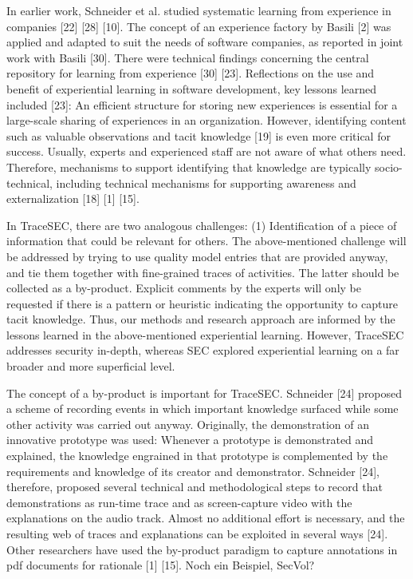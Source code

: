 In earlier work, Schneider et al. studied systematic learning from experience in companies [22] [28] [10]. The concept of an experience factory by Basili [2] was applied and adapted to suit the needs of software companies, as reported in joint work with Basili [30]. There were technical findings concerning the central repository for learning from experience [30] [23]. Reflections on the use and benefit of experiential learning in software development, key lessons learned included [23]: An efficient structure for storing new experiences is essential for a large-scale sharing of experiences in an organization. However, identifying content such as valuable observations and tacit knowledge [19] is even more critical for success. Usually, experts and experienced staff are not aware of what others need. Therefore, mechanisms to support identifying that knowledge are typically socio-technical, including technical mechanisms for supporting awareness and externalization [18] [1] [15]. 

In TraceSEC, there are two analogous challenges: (1) Identification of a piece of information that could be relevant for others. The above-mentioned challenge will be addressed by trying to use quality model entries that are provided anyway, and tie them together with fine-grained traces of activities. The latter should be collected as a by-product. Explicit comments by the experts will only be requested if there is a pattern or heuristic indicating the opportunity to capture tacit knowledge. Thus, our methods and research approach are informed by the lessons learned in the above-mentioned experiential learning. However, TraceSEC addresses security in-depth, whereas SEC explored experiential learning on a far broader and more superficial level.

The concept of a by-product is important for TraceSEC. Schneider [24] proposed a scheme of recording events in which important knowledge surfaced while some other activity was carried out anyway. Originally, the demonstration of an innovative prototype was used: Whenever a prototype is demonstrated and explained, the knowledge engrained in that prototype is complemented by the requirements and knowledge of its creator and demonstrator. Schneider [24], therefore, proposed several technical and methodological steps to record that demonstrations as run-time trace and as screen-capture video with the explanations on the audio track. Almost no additional effort is necessary, and the resulting web of traces and explanations can be exploited in several ways [24]. Other researchers have used the by-product paradigm to capture annotations in pdf documents for rationale [1] [15]. Noch ein Beispiel, SecVol?

